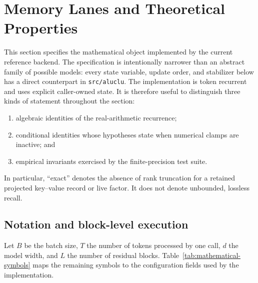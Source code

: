 \section{Memory Lanes and Theoretical Properties}
\label{sec:memory-lanes}
\label{sec:theory}

This section specifies the mathematical object implemented by the current
\ALUCLU reference backend.  The specification is intentionally narrower than
an abstract family of possible models: every state variable, update order, and
stabilizer below has a direct counterpart in
\texttt{src/aluclu}.  The implementation is token recurrent and uses explicit
caller-owned state.  It is therefore useful to distinguish three kinds of
statement throughout the section:
\begin{enumerate}
  \item algebraic identities of the real-arithmetic recurrence;
  \item conditional identities whose hypotheses state when numerical clamps
        are inactive; and
  \item empirical invariants exercised by the finite-precision test suite.
\end{enumerate}
In particular, ``exact'' denotes the absence of rank truncation for a retained
projected key--value record or live factor.  It does not denote unbounded,
lossless recall.

\subsection{Notation and block-level execution}
\label{subsec:notation-execution}

Let \(B\) be the batch size, \(T\) the number of tokens processed by one
call, \(d\) the model width, and \(L\) the number of residual blocks.
Table~\ref{tab:mathematical-symbols} maps the remaining symbols to the
configuration fields used by the implementation.


